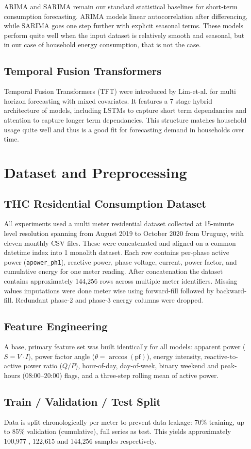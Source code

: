 ARIMA and SARIMA remain our standard statistical baselines for short-term consumption forecasting.
ARIMA models linear autocorrelation after differencing, while SARIMA goes one step further with explicit seasonal terms. 
These models perform quite well when the input dataset is relatively smooth and seasonal, but in our case of household energy consumption, that is not the case. 
 
\subsection{Temporal Fusion Transformers}

Temporal Fusion Transformers (TFT) were introduced by Lim-et-al. for multi horizon forecasting with mixed covariates. It features a 7 stage hybrid architecture of models, including LSTMs to capture short term dependancies and attention to capture longer term dependancies. This structure matches household usage quite well and thus is a good fit for forecasting demand in households over time. 
 
\section{Dataset and Preprocessing}
 
\subsection{THC Residential Consumption Dataset}
All experiments used a multi meter residential dataset collected at 15-minute level resolution spanning from August 2019 to October 2020 from Uruguay, with eleven monthly CSV files. These were concatenated and aligned on a common datetime index into 1 monolith dataset. Each row contains per-phase active power (\texttt{apower\_ph1}), reactive power, phase voltage, current, power factor, and cumulative energy for one meter reading. After concatenation the dataset contains approximately 144,256 rows across multiple meter identifiers. Missing values imputations were done meter wise using forward-fill followed by backward-fill. Redundant phase-2 and phase-3 energy columns were dropped.
 
\subsection{Feature Engineering}
A base, primary feature set was built identically for all models: apparent power ($S = V \cdot I$), power factor angle ($\theta = \arccos(\text{pf})$), energy intensity, reactive-to-active power ratio ($Q/P$), hour-of-day, day-of-week, binary weekend and peak-hours (08:00--20:00) flags, and a three-step rolling mean of active power.
 
\subsection{Train / Validation / Test Split}
Data is split chronologically per meter to prevent data leakage: 70\% training, up to 85\% validation (cumulative), full series as test. This yields approximately 100,977 , 122,615 and 144,256 samples respectively.